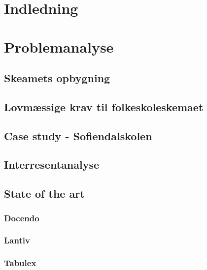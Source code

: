 \section{Indledning}
 	

\section{Problemanalyse}
 	

  \subsection{Skeamets opbygning}
   	

  \subsection{Lovmæssige krav til folkeskoleskemaet}
   	

  \subsection{Case study - Sofiendalskolen}
   	

  \subsection{Interresentanalyse}
   	
    
  \subsection{State of the art}
   	
	
    \subsubsection{Docendo}
    	
     
    \subsubsection{Lantiv}
    	
     
    \subsubsection{Tabulex}
    	

